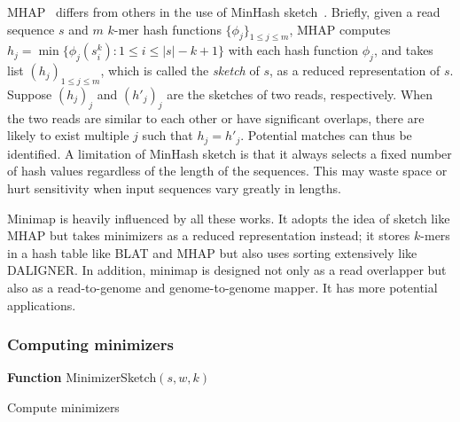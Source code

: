 \documentclass{bioinfo}
\begin{document}
\begin{methods}
MHAP~\citep{Berlin:2015xy} differs from others in the use of MinHash
sketch~\citep{Broder:1997aa}.  Briefly, given a read sequence $s$ and $m$
$k$-mer hash functions $\{\phi_j\}_{1\le j\le m}$, MHAP computes
$h_j=\min\{\phi_j(s_i^k):1\le i\le |s|-k+1\}$ with each hash function $\phi_j$, and
takes list $(h_j)_{1\le j\le m}$, which is called the \emph{sketch} of
$s$, as a reduced representation of $s$. Suppose $(h_j)_j$ and $(h'_j)_j$ are
the sketches of two reads, respectively. When the two reads are similar to each
other or have significant overlaps, there are likely to exist multiple $j$ such
that $h_j=h'_j$. Potential matches can thus be identified. A limitation of
MinHash sketch is that it always selects a fixed number of hash values
regardless of the length of the sequences. This may waste space or hurt
sensitivity when input sequences vary greatly in lengths.

Minimap is heavily influenced by all these works. It adopts the idea of sketch
like MHAP but takes minimizers \citep{Roberts:2004fv} as a reduced
representation instead; it stores $k$-mers in a hash table like BLAT and MHAP
but also uses sorting extensively like DALIGNER. In addition, minimap is
designed not only as a read overlapper but also as a read-to-genome and
genome-to-genome mapper. It has more potential applications.

\subsubsection{Computing minimizers}

\begin{algorithm}[tb]
\DontPrintSemicolon
\footnotesize
{}
\BlankLine
\textbf{Function} {\sc MinimizerSketch}$(s,w,k)$
\caption{Compute minimizers}
\end{algorithm}


\end{methods}
\end{document}
